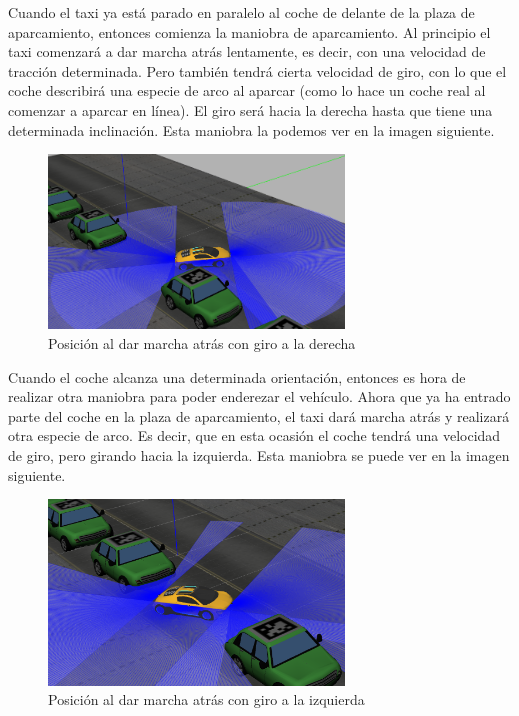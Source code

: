 Cuando el taxi ya está parado en paralelo al coche de delante de la plaza de aparcamiento, entonces comienza la maniobra de aparcamiento. Al principio el taxi comenzará a dar marcha atrás lentamente, es decir, con una velocidad de tracción determinada. Pero también tendrá cierta velocidad de giro, con lo que el coche describirá una especie de arco al aparcar (como lo hace un coche real al comenzar a aparcar en línea). El giro será hacia la derecha hasta que tiene una determinada inclinación. Esta maniobra la podemos ver en la imagen siguiente.

\begin{figure}[H]
  \begin{center}
    \includegraphics[width=0.7\textwidth]{figures/Autopark/Posicion3.png}
		\caption{Posición al dar marcha atrás con giro a la derecha}
		\label{fig.Posicion3}
		\end{center}
\end{figure}

Cuando el coche alcanza una determinada orientación, entonces es hora de realizar otra maniobra para poder enderezar el vehículo. Ahora que ya ha entrado parte del coche en la plaza de aparcamiento, el taxi dará marcha atrás y realizará otra especie de arco. Es decir, que en esta ocasión el coche tendrá una velocidad de giro, pero girando hacia la izquierda. Esta maniobra se puede ver en la imagen siguiente.

\begin{figure}[H]
  \begin{center}
    \includegraphics[width=0.7\textwidth]{figures/Autopark/Posicion4.png}
		\caption{Posición al dar marcha atrás con giro a la izquierda}
		\label{fig.Posicion4}
		\end{center}
\end{figure}

